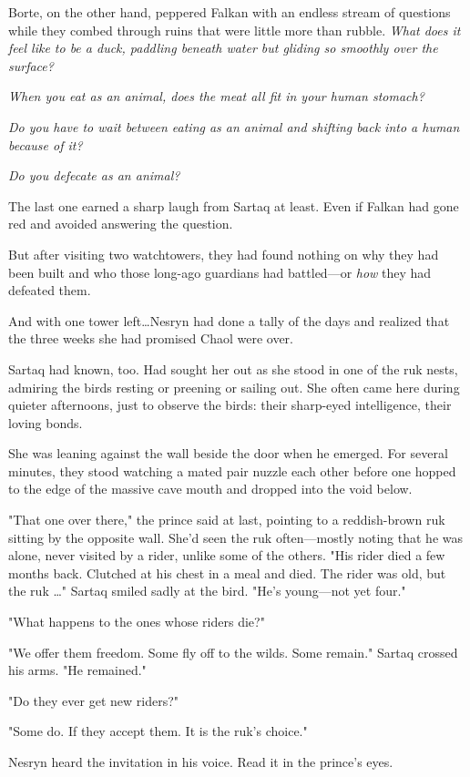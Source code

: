Borte, on the other hand, peppered Falkan with an endless stream of questions while they combed through ruins that were little more than rubble.
\emph{What does it feel like to be a duck, paddling beneath water but gliding so smoothly over the surface?}

\emph{When you eat as an animal, does the meat all fit in your human stomach?}

\emph{Do you have to wait between eating as an animal and shifting back into a human because of it?}

\emph{Do you defecate as an animal?}

The last one earned a sharp laugh from Sartaq at least.
Even if Falkan had gone red and avoided answering the question.

But after visiting two watchtowers, they had found nothing on why they had been built and who those long-ago guardians had battled---or \emph{how} they had defeated them.

And with one tower left\ldots Nesryn had done a tally of the days and realized that the three weeks she had promised Chaol were over.

Sartaq had known, too.
Had sought her out as she stood in one of the ruk nests, admiring the birds resting or preening or sailing out.
She often came here during quieter afternoons, just to observe the birds: their sharp-eyed intelligence, their loving bonds.

She was leaning against the wall beside the door when he emerged.
For several minutes, they stood watching a mated pair nuzzle each other before one hopped to the edge of the massive cave mouth and dropped into the void below.

"That one over there," the prince said at last, pointing to a reddish-brown ruk sitting by the opposite wall.
She'd seen the ruk often---mostly noting that he was alone, never visited by a rider, unlike some of the others.
"His rider died a few months back.
Clutched at his chest in a meal and died.
The rider was old, but the ruk \ldots" Sartaq smiled sadly at the bird.
"He's young---not yet four."

"What happens to the ones whose riders die?"

"We offer them freedom.
Some fly off to the wilds.
Some remain."
Sartaq crossed his arms.
"He remained."

"Do they ever get new riders?"

"Some do.
If they accept them.
It is the ruk's choice."

Nesryn heard the invitation in his voice.
Read it in the prince's eyes.

